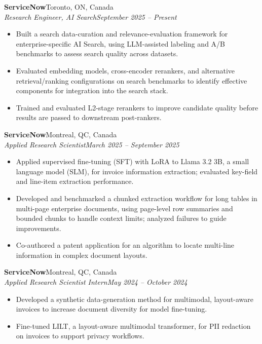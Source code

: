 \documentclass[letterpaper,10pt]{article}
\newcommand{\entry}[4]{%
  \textbf{#1}\hfill #2\\[-2pt]
  \textit{#3}\hfill \textit{#4}\vspace{-3pt}
}
\begin{document}
\entry{ServiceNow}{Toronto, ON, Canada}{Research Engineer, AI Search}{September 2025 -- Present}
\begin{itemize}
  \item Built a search data-curation and relevance-evaluation framework for enterprise-specific AI Search, using LLM-assisted labeling and A/B benchmarks to assess search quality across datasets.
  \item Evaluated embedding models, cross-encoder rerankers, and alternative retrieval/ranking configurations on search benchmarks to identify effective components for integration into the search stack.
  \item Trained and evaluated L2-stage rerankers to improve candidate quality before results are passed to downstream post-rankers.
\end{itemize}

\entry{ServiceNow}{Montreal, QC, Canada}{Applied Research Scientist}{March 2025 -- September 2025}
\begin{itemize}
  \item Applied supervised fine-tuning (SFT) with LoRA to Llama 3.2 3B, a small language model (SLM), for invoice information extraction; evaluated key-field and line-item extraction performance.
  \item Developed and benchmarked a chunked extraction workflow for long tables in multi-page enterprise documents, using page-level row summaries and bounded chunks to handle context limits; analyzed failures to guide improvements.
  \item Co-authored a patent application for an algorithm to locate multi-line information in complex document layouts.
\end{itemize}

\entry{ServiceNow}{Montreal, QC, Canada}{Applied Research Scientist Intern}{May 2024 -- October 2024}
\begin{itemize}
  \item Developed a synthetic data-generation method for multimodal, layout-aware invoices to increase document diversity for model fine-tuning.
  \item Fine-tuned LILT, a layout-aware multimodal transformer, for PII redaction on invoices to support privacy workflows.
\end{itemize}
\end{document}
